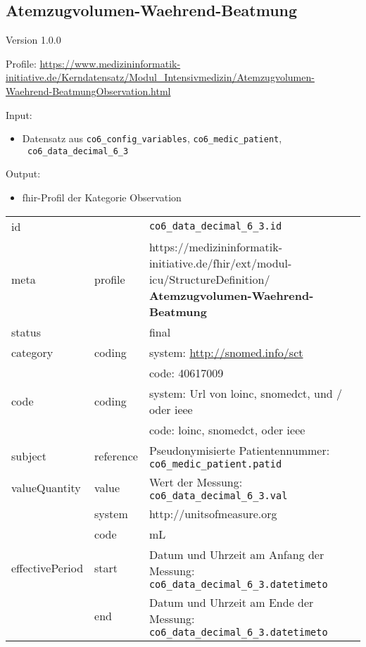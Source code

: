 \subsection{
Atemzugvolumen-Waehrend-Beatmung} 
\noindent Version 1.0.0

\noindent Profile: \url{https://www.medizininformatik-initiative.de/Kerndatensatz/Modul_Intensivmedizin/Atemzugvolumen-Waehrend-BeatmungObservation.html}

\noindent Input:
\begin{itemize}
	\item Datensatz aus \texttt{co6\_config\_variables}, \texttt{co6\_medic\_patient}, \\ \texttt{
co6\_data\_decimal\_6\_3}
\end{itemize}
Output:
\begin{itemize}
        \item \ac{fhir}-Profil der Kategorie \glqq Observation\grqq{}
\end{itemize}
\begin{longtable}{|l|l|p{7.5cm}|}
        \hline
        \rowcolor{lightgray} \multicolumn{3}{|l|}{Data Mapping (inhaltlich)} \\ \hline
        id &  & \texttt{co6\_data\_decimal\_6\_3.id} \\ \hline
	meta & profile & https://medizininformatik-initiative.de/fhir/ext/modul-icu/StructureDefinition/\textbf{
Atemzugvolumen-Waehrend-Beatmung} \\ \hline 
	status &  & final  \\ \hline 
	category & coding & system: \url{http://snomed.info/sct} \\
\cline{3-3}
	& & code: 40617009 \\ \hline
	code & coding & system: Url von \ac{loinc}, \ac{snomedct}, und / oder \ac{ieee} \\ 
	\cline{3-3} 
	 &  & code: \ac{loinc}, \ac{snomedct}, oder \ac{ieee} \\ \hline
	subject & reference & Pseudonymisierte Patientennummer: \texttt{co6\_medic\_patient.patid} \\ \hline
	valueQuantity & value & Wert der Messung: \texttt{
co6\_data\_decimal\_6\_3.val} \\
        \cline{2-3}
         & system & http://unitsofmeasure.org \\
         \cline{2-3}
         & code & mL
\\ \hline
    effectivePeriod & start & Datum und Uhrzeit am Anfang der Messung: \texttt{
co6\_data\_decimal\_6\_3.datetimeto} \\
    \cline{2-3}
     & end & Datum und Uhrzeit am Ende der Messung: \texttt{
co6\_data\_decimal\_6\_3.datetimeto} \\ \hline
\end{longtable}


